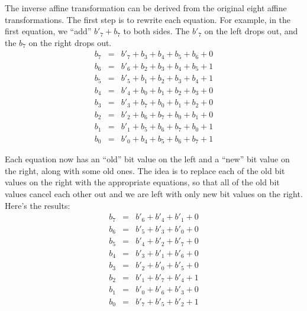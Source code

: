 \documentclass{article}
\begin{document}
The inverse affine transformation can be derived
from the original eight affine transformations.
The first step is to rewrite each equation.
For example, in the first equation, we ``add'' $b'_7 + b_7$ to both sides.
The $b'_7$ on the left drops out, and the $b_7$ on the right drops out.
\begin{eqnarray*}
  b_7 &=& b'_7 + b_3 + b_4 + b_5 + b_6 + 0 \\
  b_6 &=& b'_6 + b_2 + b_3 + b_4 + b_5 + 1 \\
  b_5 &=& b'_5 + b_1 + b_2 + b_3 + b_4 + 1 \\
  b_4 &=& b'_4 + b_0 + b_1 + b_2 + b_3 + 0 \\
  b_3 &=& b'_3 + b_7 + b_0 + b_1 + b_2 + 0 \\
  b_2 &=& b'_2 + b_6 + b_7 + b_0 + b_1 + 0 \\
  b_1 &=& b'_1 + b_5 + b_6 + b_7 + b_0 + 1 \\
  b_0 &=& b'_0 + b_4 + b_5 + b_6 + b_7 + 1
\end{eqnarray*}

Each equation now has an ``old'' bit value on the left
and a ``new'' bit value on the right, along with some old ones.
The idea is to replace each of the old bit values on the right
with the appropriate equations, so that all of the old bit values 
cancel each other out and we are left with only new bit values on the right.
Here's the results:
\begin{eqnarray*}
  b_7 &=& b'_6 + b'_4 + b'_1 + 0 \\
  b_6 &=& b'_5 + b'_3 + b'_0 + 0 \\
  b_5 &=& b'_4 + b'_2 + b'_7 + 0 \\
  b_4 &=& b'_3 + b'_1 + b'_6 + 0 \\
  b_3 &=& b'_2 + b'_0 + b'_5 + 0 \\
  b_2 &=& b'_1 + b'_7 + b'_4 + 1 \\
  b_1 &=& b'_0 + b'_6 + b'_3 + 0 \\
  b_0 &=& b'_7 + b'_5 + b'_2 + 1
\end{eqnarray*}
\end{document}
